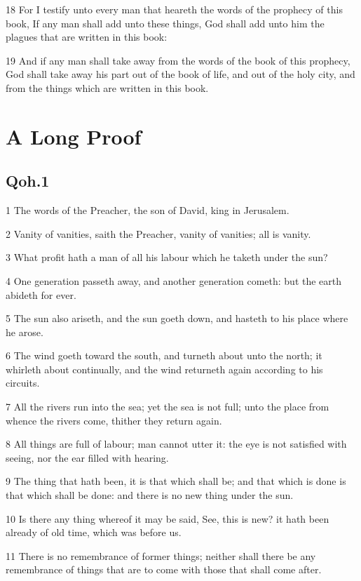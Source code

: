 \documentclass[12pt]{report}
\begin{document}
    18 For I testify unto every man that heareth the words of the
    prophecy of this book, If any man shall add unto these things, God
    shall add unto him the plagues that are written in this book:
    
    19 And if any man shall take away from the words of the book of
    this prophecy, God shall take away his part out of the book of
    life, and out of the holy city, and from the things which are
    written in this book.

    \appendix
    \chapter{A Long Proof}

\section{Qoh.1}

1 The words of the Preacher, the son of David, king in Jerusalem.

2 Vanity of vanities, saith the Preacher, vanity of vanities; all is
vanity.

3 What profit hath a man of all his labour which he taketh under the
sun?

4 One generation passeth away, and another generation cometh: but the
earth abideth for ever.

5 The sun also ariseth, and the sun goeth down, and hasteth to his
place where he arose.

6 The wind goeth toward the south, and turneth about unto the north;
it whirleth about continually, and the wind returneth again according
to his circuits.

7 All the rivers run into the sea; yet the sea is not full; unto the
place from whence the rivers come, thither they return again.

   
8 All things are full of labour; man cannot utter it: the eye is
   not
   satisfied with seeing, nor the ear filled with hearing.
   
9 The thing that hath been, it is that which shall be; and that
   which is done is that which shall be done: and there is no new
   thing
   under the sun.
   
10 Is there any thing whereof it may be said, See, this is new?
   it
   hath been already of old time, which was before us.
   
11 There is no remembrance of former things; neither shall there
   be
   any remembrance of things that are to come with those that shall
   come
   after.
   
\end{document}
